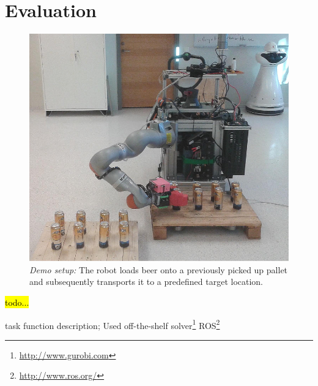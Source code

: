 \section{Evaluation}
\label{sec:eval}
%
\begin{figure}[t!]
\begin{center}
\includegraphics[width =1\linewidth]{figs/demo}
\caption{\textit{Demo setup:} The robot loads beer onto a previously picked up pallet and
  subsequently transports it to a predefined target location.}
\label{fig:demo_setup}
\vspace{-0.65cm}
\end{center}
\end{figure}
%
\hl{todo...}

\cite{Kano09} task function description; Used off-the-shelf
solver\footnote{\url{http://www.gurobi.com}} ROS\footnote{\url{http://www.ros.org/}}
